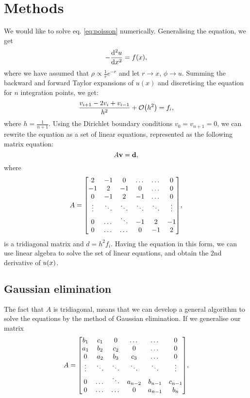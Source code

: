 \section{Methods}
\label{sec:methods}

We would like to solve eq. \ref{eq:poisson} numerically. Generalising the
equation, we get
  \begin{equation}
    -\dv[2]{u}{x} = f\qty(x),
  \end{equation}
where we have assumed that $\rho \propto \frac{1}{r}e^{-r}$ and let $ r
\rightarrow x$, $\phi \rightarrow u$.
Summing the backward and forward Taylor expansions of $u(x)$ and discretising
the equation for $n$ integration points, we get:
  \begin{equation}
    \frac{v_{i+1} - 2v_i + v_{i-1}}{h^2} + \order{h^2} = f_i,
  \end{equation}
where $h = \frac{1}{n+1}$. Using the Dirichlet boundary conditions
$v_0 = v_{n+1} = 0$, we can rewrite the equation as a set of linear equations,
represented as the following matrix equation:
  \begin{equation}
    A\vb{v} = \vb{d},
  \end{equation}
where
  \[A =
    \mqty[2 & -1 & 0 & \dots & \dots & 0 \\
          -1 & 2 & -1 & 0 & \dots & 0 \\
          0 & -1 & 2 & -1 & \dots & 0 \\
          \vdots & \ddots & \ddots & \ddots & \ddots & \vdots \\
          0 & \dots & \ddots & -1 & 2 & -1 \\
          0 & \dots & \dots & 0 & -1 & 2],
  \]
is a tridiagonal matrix and $d = h^{2}f_i$.
Having the equation in this form, we can use linear algebra to solve the set of
linear equations, and obtain the 2nd derivative of $u\qty(x)$.


\subsection{Gaussian elimination}
\label{sec:gaussian}

The fact that $A$ is tridiagonal, means that we can develop a general algorithm
to solve the equations by the method of Gaussian elimination. If we generalise
our matrix
  \[A =
    \mqty[b_1 & c_1 & 0 & \dots & \dots & 0 \\
          a_1 & b_2 & c_2 & 0 & \dots & 0 \\
          0 & a_2 & b_3 & c_3 & \dots & 0 \\
          \vdots & \ddots & \ddots & \ddots & \ddots & \vdots \\
          0 & \dots & \ddots & a_{n-2} & b_{n-1} & c_{n-1} \\
          0 & \dots & \dots & 0 & a_{n-1} & b_n],
  \]
